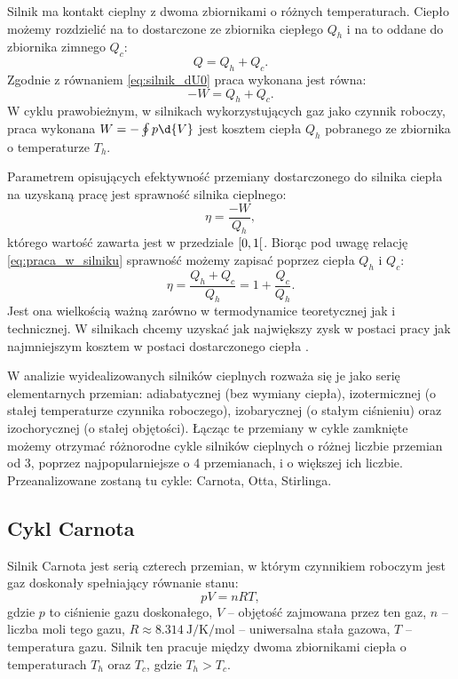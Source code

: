 Silnik ma kontakt cieplny z dwoma zbiornikami o różnych temperaturach. Ciepło możemy rozdzielić na to dostarczone ze zbiornika ciepłego \(Q_h\) i na to oddane do zbiornika zimnego \(Q_c\):
\begin{equation}\label{eq:ciepla_w_silniku}
	Q = Q_h + Q_c.
\end{equation}
Zgodnie z równaniem \eqref{eq:silnik_dU0} praca wykonana jest równa:
\begin{equation}\label{eq:praca_w_silniku}
	-W = Q_h + Q_c.
\end{equation}
W cyklu prawobieżnym, w silnikach wykorzystujących gaz jako czynnik roboczy, praca wykonana \(W = - \oint p \d{V}\) jest kosztem ciepła \(Q_h\) pobranego ze zbiornika o temperaturze \(T_h\).

Parametrem opisujących efektywność przemiany dostarczonego do silnika ciepła na uzyskaną pracę jest sprawność silnika cieplnego:
\begin{equation}\label{eq:def_sprawnosc_silnika_W}
\eta = \frac{-W}{Q_h},
\end{equation}
którego wartość zawarta jest w przedziale \(\interval[open right]{0}{1}\). Biorąc pod uwagę relację \eqref{eq:praca_w_silniku} sprawność możemy zapisać poprzez ciepła \(Q_h\) i \(Q_c\):
\begin{equation}\label{eq:def_sprawnosc_silnika}
	 \eta = \frac{Q_h + Q_c}{Q_h} = 1 + \frac{Q_c}{Q_h}.
\end{equation}
Jest ona wielkością ważną zarówno w termodynamice teoretycznej jak i technicznej. W silnikach chcemy uzyskać jak największy zysk w postaci pracy jak najmniejszym kosztem w postaci dostarczonego ciepła \cite{b:pudlik_termodynamika}.

W analizie wyidealizowanych silników cieplnych rozważa się je jako serię elementarnych przemian: adiabatycznej (bez wymiany ciepła), izotermicznej (o stałej temperaturze czynnika roboczego), izobarycznej (o stałym ciśnieniu) oraz izochorycznej (o stałej objętości). Łącząc te przemiany w cykle zamknięte możemy otrzymać różnorodne cykle silników cieplnych o różnej liczbie przemian od 3, poprzez najpopularniejsze o 4 przemianach, i o większej ich liczbie. Przeanalizowane zostaną tu cykle: Carnota, Otta, Stirlinga.

\subsection{Cykl Carnota}\label{ssec:cykl_carnota}
Silnik Carnota jest serią czterech przemian, w którym czynnikiem roboczym jest gaz doskonały spełniający równanie stanu:
\begin{equation}\label{eq:def_gaz_doskonaly}
	pV = nRT,
\end{equation}
gdzie \(p\) to ciśnienie gazu doskonałego, \(V\) -- objętość zajmowana przez ten gaz, \(n\) -- liczba moli tego gazu, \(R \approx \qty{8.314}{\joule / \kelvin / \mol}\) -- uniwersalna stała gazowa, \(T\) -- temperatura gazu. Silnik ten pracuje między dwoma zbiornikami ciepła o temperaturach \(T_h\) oraz \(T_c\), gdzie \(T_h > T_c\).

